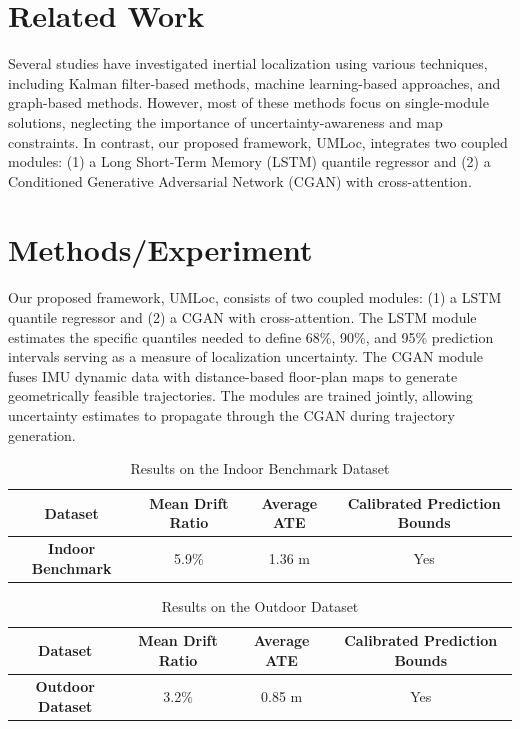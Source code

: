 \documentclass{article}
\begin{document}
\section{Related Work}
\label{sec:related-work}
Several studies have investigated inertial localization using various techniques, including Kalman filter-based methods, machine learning-based approaches, and graph-based methods. However, most of these methods focus on single-module solutions, neglecting the importance of uncertainty-awareness and map constraints. In contrast, our proposed framework, UMLoc, integrates two coupled modules: (1) a Long Short-Term Memory (LSTM) quantile regressor and (2) a Conditioned Generative Adversarial Network (CGAN) with cross-attention.

\section{Methods/Experiment}
\label{sec:methods-experiment}
Our proposed framework, UMLoc, consists of two coupled modules: (1) a LSTM quantile regressor and (2) a CGAN with cross-attention. The LSTM module estimates the specific quantiles needed to define 68\%, 90\%, and 95\% prediction intervals serving as a measure of localization uncertainty. The CGAN module fuses IMU dynamic data with distance-based floor-plan maps to generate geometrically feasible trajectories. The modules are trained jointly, allowing uncertainty estimates to propagate through the CGAN during trajectory generation.

\begin{table}[!ht]
\centering
\begin{tabular}{|c|c|c|c|}
\hline
\textbf{Dataset} & \textbf{Mean Drift Ratio} & \textbf{Average ATE} & \textbf{Calibrated Prediction Bounds} \\
\hline
\textbf{Indoor Benchmark} & 5.9\% & 1.36 m & Yes \\
\hline
\end{tabular}
\caption{Results on the Indoor Benchmark Dataset}
\label{tab:results-indoor-benchmark}
\end{table}

\begin{table}[!ht]
\centering
\begin{tabular}{|c|c|c|c|}
\hline
\textbf{Dataset} & \textbf{Mean Drift Ratio} & \textbf{Average ATE} & \textbf{Calibrated Prediction Bounds} \\
\hline
\textbf{Outdoor Dataset} & 3.2\% & 0.85 m & Yes \\
\hline
\end{tabular}
\caption{Results on the Outdoor Dataset}
\label{tab:results-outdoor-dataset}
\end{table}
\end{document}
